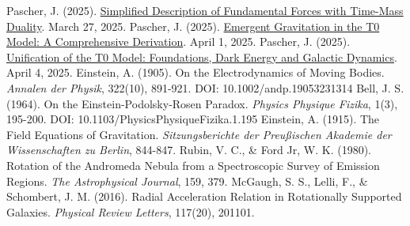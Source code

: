 \documentclass[12pt,a4paper]{article}
\begin{document}
\begin{thebibliography}{99}
		 Pascher, J. (2025). \href{https://github.com/jpascher/T0-Time-Mass-Duality/tree/main/2/pdf/English/VierKraefteZeitMasseEn.pdf}{Simplified Description of Fundamental Forces with Time-Mass Duality}. March 27, 2025.
		 Pascher, J. (2025). \href{https://github.com/jpascher/T0-Time-Mass-Duality/tree/main/2/pdf/English/EmergentGravT0En.pdf}{Emergent Gravitation in the T0 Model: A Comprehensive Derivation}. April 1, 2025.
		 Pascher, J. (2025). \href{https://github.com/jpascher/T0-Time-Mass-Duality/tree/main/2/pdf/English/T0VereinheitlichungDEGalEn.pdf}{Unification of the T0 Model: Foundations, Dark Energy and Galactic Dynamics}. April 4, 2025.
		 Einstein, A. (1905). On the Electrodynamics of Moving Bodies. \textit{Annalen der Physik}, 322(10), 891-921. DOI: 10.1002/andp.19053231314
		 Bell, J. S. (1964). On the Einstein-Podolsky-Rosen Paradox. \textit{Physics Physique Fizika}, 1(3), 195-200. DOI: 10.1103/PhysicsPhysiqueFizika.1.195
		 Einstein, A. (1915). The Field Equations of Gravitation. \textit{Sitzungsberichte der Preußischen Akademie der Wissenschaften zu Berlin}, 844-847.
		 Rubin, V. C., \& Ford Jr, W. K. (1980). Rotation of the Andromeda Nebula from a Spectroscopic Survey of Emission Regions. \textit{The Astrophysical Journal}, 159, 379.
		 McGaugh, S. S., Lelli, F., \& Schombert, J. M. (2016). Radial Acceleration Relation in Rotationally Supported Galaxies. \textit{Physical Review Letters}, 117(20), 201101.
	\end{thebibliography}
	
\end{document}
